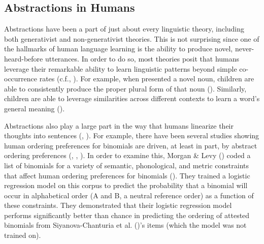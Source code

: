 \documentclass[
  12pt,
  letterpaper,
]{scrreprt}
\begin{document}
\subsection{Abstractions in Humans}\label{abstractions-in-humans}

Abstractions have been a part of just about every linguistic theory,
including both generativist and non-generativist theories. This is not
surprising since one of the hallmarks of human language learning is the
ability to produce novel, never-heard-before utterances. In order to do
so, most theories posit that humans leverage their remarkable ability to
learn linguistic patterns beyond simple co-occurrence rates (c.f.,
).
For example, when presented a novel noun, children are able to
consistently produce the proper plural form of that noun
(). Similarly,
children are able to leverage similarities across different contexts to
learn a word's general meaning
().

Abstractions also play a large part in the way that humans linearize
their thoughts into sentences
(, ). For example, there have been
several studies showing human ordering preferences for binomials are
driven, at least in part, by abstract ordering preferences
(,
,
). In order to examine this, Morgan \&
Levy () coded a
list of binomials for a variety of semantic, phonological, and metric
constraints that affect human ordering preferences for binomials
().
They trained a logistic regression model on this corpus to predict the
probability that a binomial will occur in alphabetical order (A and B, a
neutral reference order) as a function of these constraints. They
demonstrated that their logistic regression model performs significantly
better than chance in predicting the ordering of attested binomials from
Siyanova-Chanturia et al.
()'s items
(which the model was not trained on).
\end{document}
